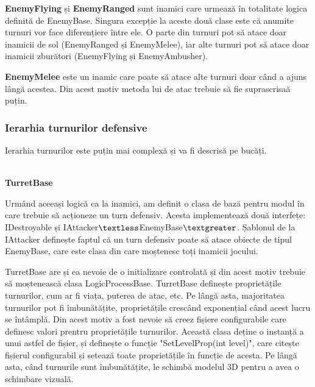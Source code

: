 \documentclass[12pt, a4paper]{article}
\begin{document}
	\textbf{EnemyFlying} și \textbf{EnemyRanged} sunt inamici care urmează în totalitate logica definită de EnemyBase. Singura excepție la aceste două clase este că anumite turnuri vor face diferențiere între ele. O parte din turnuri pot să atace doar inamicii de sol (EnemyRanged și EnemyMelee), iar alte turnuri pot să atace doar inamicii zburători (EnemyFlying și EnemyAmbusher).
	\newline
	
	\textbf{EnemyMelee} este un inamic care poate să atace alte turnuri doar când a ajuns lângă acestea. Din acest motiv metoda lui de atac trebuie să fie suprascrisaă puțin.
	
	
	
	
	
	\subsubsection{Ierarhia turnurilor defensive}
	\label{section: turretHierachy}
	
	Ierarhia turnurilor este puțin mai complexă și va fi descrisă pe bucăți.
	
	\ \\
	\textbf{TurretBase}
	
	Urmând aceeași logică ca la inamici, am definit o clasa de bază pentru modul în care trebuie să acționeze un turn defensiv. Acesta implementează două interfețe: IDestroyable și IAttacker$\textless$EnemyBase$\textgreater$. Șablonul de la IAttacker definește faptul că un turn defensiv poate să atace obiecte de tipul EnemyBase, care este clasa din care moștenesc toți inamicii jocului.
	\newline
	
	TurretBase are și ea nevoie de o initializare controlată și din acest motiv trebuie să moștenească clasa LogicProcessBase. TurretBase definește proprietățile turnurilor, cum ar fi viața, puterea de atac, etc. Pe lângă asta, majoritatea turnurilor pot fi îmbunătățite, proprietățile crescând exponențial când acest lucru se întâmplă. Din acest motiv a fost nevoie să creez fișiere configurabile care definesc valori prentru proprietățile turnurilor. Această clasa deține o instanță a unui astfel de fișier, și definește o funcție "SetLevelProp(int level)", care citește fișierul configurabil și setează toate proprietățile în funcție de acesta. Pe lângă asta, când turnurile sunt îmbunătățite, le schimbă modelul 3D pentru a avea o schimbare vizuală.
	\newline
	
\end{document}
